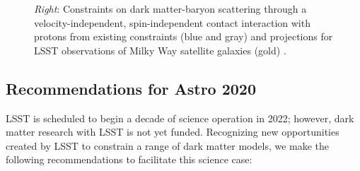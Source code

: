 \documentclass[12pt]{article}
\begin{document}
\begin{figure}[t]
{    %
    \emph{Right}: Constraints on dark matter-baryon scattering through a velocity-independent, spin-independent contact interaction with protons from existing constraints (blue and gray) and projections for LSST observations of Milky Way satellite galaxies (gold) \citep{drlica-wagner_2019_lsst_dark_matter,Gluscevic:prep}.
}
\end{figure}

\vspace{-1em} \subsection*{Recommendations for Astro 2020} \vspace{-0.5em}

LSST is scheduled to begin a decade of science operation in 2022; however, dark matter research with LSST is not yet funded.
Recognizing new opportunities created by LSST to constrain a range of dark matter models, we make the following recommendations to facilitate this science case:
\end{document}
